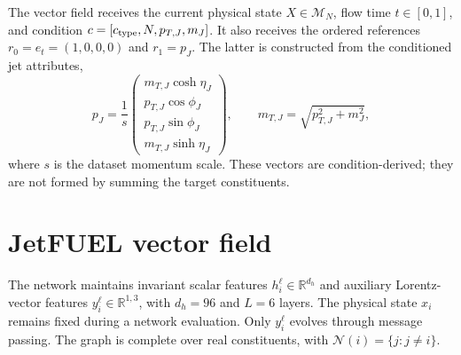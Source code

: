 \documentclass[10pt]{article}
\newcommand{\R}{\mathbb{R}}
\begin{document}
The vector field receives the current physical state $X\in\mathcal{M}_N$, flow
time $t\in[0,1]$, and condition $c=[c_{\rm type},N,p_{T,J},m_J]$. It also receives
the ordered references $r_0=e_t=(1,0,0,0)$ and $r_1=p_J$. The latter is constructed
from the conditioned jet attributes,
\begin{equation}
 p_J=\frac{1}{s}
 \begin{pmatrix}
 m_{T,J}\cosh\eta_J\\
 p_{T,J}\cos\phi_J\\
 p_{T,J}\sin\phi_J\\
 m_{T,J}\sinh\eta_J
 \end{pmatrix},\qquad m_{T,J}=\sqrt{p_{T,J}^2+m_J^2},
 \label{eq:jet-reference}
\end{equation}
where $s$ is the dataset momentum scale. These vectors are condition-derived;
they are not formed by summing the target constituents.

\section{JetFUEL vector field}

The network maintains invariant scalar features $h_i^\ell\in\R^{d_h}$ and
auxiliary Lorentz-vector features $y_i^\ell\in\R^{1,3}$, with $d_h=96$ and
$L=6$ layers. The physical state $x_i$ remains fixed during a network evaluation.
Only $y_i^\ell$ evolves through message passing. The graph is complete over real
constituents, with $\mathcal{N}(i)=\{j:j\neq i\}$.
\end{document}
